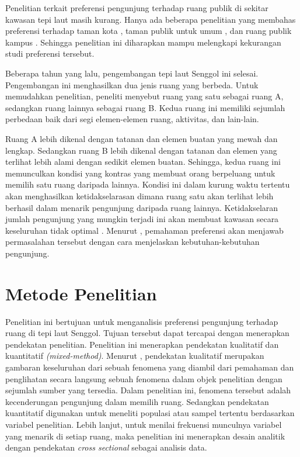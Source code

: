 \documentclass[11pt]{simartadv} %
\begin{document}
Penelitian terkait preferensi pengunjung terhadap ruang publik di sekitar kawasan tepi laut masih kurang. Hanya ada beberapa penelitian yang membahas preferensi terhadap taman kota \citep{alves2008,devysandra2012,dwiputra2017,madureira2018}, taman publik untuk umum  \citep{grilli2020}, dan ruang publik kampus \citep{zhang2006}. Sehingga penelitian ini diharapkan mampu melengkapi kekurangan studi preferensi tersebut.

Beberapa tahun yang lalu, pengembangan tepi laut Senggol ini selesai. Pengembangan ini menghasilkan dua jenis ruang yang berbeda. Untuk memudahkan penelitian, peneliti menyebut ruang yang satu sebagai ruang A, sedangkan ruang lainnya sebagai ruang B. Kedua ruang ini memiliki sejumlah perbedaan baik dari segi elemen-elemen ruang, aktivitas, dan lain-lain.

Ruang A lebih dikenal dengan tatanan dan elemen buatan yang mewah dan lengkap. Sedangkan ruang B lebih dikenal dengan tatanan dan elemen yang terlihat lebih alami dengan sedikit elemen buatan. Sehingga, kedua ruang ini memunculkan kondisi yang kontras yang membuat orang berpeluang untuk memilih satu ruang daripada lainnya. Kondisi ini dalam kurung waktu tertentu akan menghasilkan ketidakselarasan dimana ruang satu akan terlihat lebih berhasil dalam menarik pengunjung daripada ruang lainnya. Ketidakselaran jumlah pengunjung yang mungkin terjadi ini akan membuat kawasan secara keseluruhan tidak optimal \citep{sari2015}. Menurut \cite{madureira2018}, pemahaman preferensi akan menjawab permasalahan tersebut dengan cara menjelaskan kebutuhan-kebutuhan pengunjung.



\section{Metode Penelitian}
\label{sub:metpen}

Penelitian ini bertujuan untuk menganalisis preferensi pengunjung terhadap ruang di tepi laut Senggol. Tujuan tersebut dapat tercapai dengan menerapkan pendekatan penelitian. Penelitian ini menerapkan pendekatan kualitatif dan kuantitatif \textit{(mixed-method)}. Menurut \cite{creswell2016}, pendekatan kualitatif merupakan gambaran keseluruhan dari sebuah fenomena yang diambil dari pemahaman dan penglihatan secara langsung sebuah fenomena dalam objek penelitian dengan sejumlah sumber yang tersedia. Dalam penelitian ini, fenomena tersebut adalah kecenderungan pengunjung dalam memilih ruang. Sedangkan pendekatan kuantitatif digunakan untuk meneliti populasi atau sampel tertentu berdasarkan variabel penelitian. Lebih lanjut, untuk menilai frekuensi munculnya variabel yang menarik di setiap ruang, maka penelitian ini menerapkan desain analitik dengan pendekatan \textit{cross sectional} sebagai analisis data.
\end{document}

